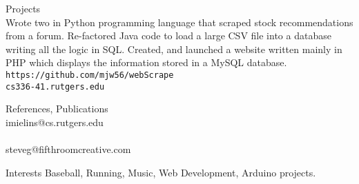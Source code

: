 \documentclass{resume}
\begin{document}
\begin{category}{Projects}
\\
Wrote two in Python programming language that scraped stock recommendations from a forum. Re-factored Java code to load a large CSV file into a database writing all the logic in SQL. Created, and launched a website written mainly in PHP which displays the information stored in a MySQL database. \\
\mbox{\small\tt https://github.com/mjw56/webScrape}\\
\mbox{\small\tt cs336-41.rutgers.edu}
\end{category}



\begin{category}{References, Publications} 
\\
imielins@cs.rutgers.edu \\
\\
steveg@fifthroomcreative.com\\
\end{category}

\begin{category}{Interests}
\citemnobullet
Baseball, Running, Music, Web Development, Arduino projects.
\end{category}
\end{document}
